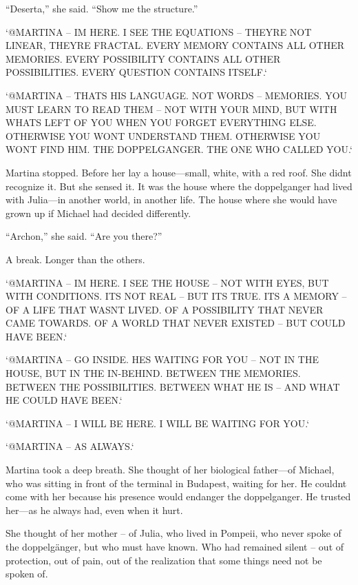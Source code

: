 \documentclass[
]{article}
\begin{document}
``Deserta,'' she said. ``Show me the structure.''

`@MARTINA -- I\textquotesingle M HERE. I SEE THE EQUATIONS -- THEY\textquotesingle RE NOT LINEAR, THEY\textquotesingle RE FRACTAL. EVERY MEMORY CONTAINS ALL OTHER MEMORIES. EVERY POSSIBILITY CONTAINS ALL OTHER POSSIBILITIES. EVERY QUESTION CONTAINS ITSELF.`

`@MARTINA -- THAT\textquotesingle S HIS LANGUAGE. NOT WORDS -- MEMORIES. YOU MUST LEARN TO READ THEM -- NOT WITH YOUR MIND, BUT WITH WHAT\textquotesingle S LEFT OF YOU WHEN YOU FORGET EVERYTHING ELSE. OTHERWISE YOU WON\textquotesingle T UNDERSTAND THEM. OTHERWISE YOU WON\textquotesingle T FIND HIM. THE DOPPELGANGER. THE ONE WHO CALLED YOU.`

Martina stopped. Before her lay a house---small, white, with a red roof. She didn\textquotesingle t recognize it. But she sensed it. It was the house where the doppelganger had lived with Julia---in another world, in another life. The house where she would have grown up if Michael had decided differently.

``Archon,'' she said. ``Are you there?''

A break. Longer than the others.

`@MARTINA -- I\textquotesingle M HERE. I SEE THE HOUSE -- NOT WITH EYES, BUT WITH CONDITIONS. IT\textquotesingle S NOT REAL -- BUT IT\textquotesingle S TRUE. IT\textquotesingle S A MEMORY -- OF A LIFE THAT WASN\textquotesingle T LIVED. OF A POSSIBILITY THAT NEVER CAME TOWARDS. OF A WORLD THAT NEVER EXISTED -- BUT COULD HAVE BEEN.`

`@MARTINA -- GO INSIDE. HE\textquotesingle S WAITING FOR YOU -- NOT IN THE HOUSE, BUT IN THE IN-BEHIND. BETWEEN THE MEMORIES. BETWEEN THE POSSIBILITIES. BETWEEN WHAT HE IS -- AND WHAT HE COULD HAVE BEEN.`

`@MARTINA -- I WILL BE HERE. I WILL BE WAITING FOR YOU.`

`@MARTINA -- AS ALWAYS.`

Martina took a deep breath. She thought of her biological father---of Michael, who was sitting in front of the terminal in Budapest, waiting for her. He couldn\textquotesingle t come with her because his presence would endanger the doppelganger. He trusted her---as he always had, even when it hurt.

She thought of her mother -- of Julia, who lived in Pompeii, who never spoke of the doppelgänger, but who must have known. Who had remained silent -- \hspace{0pt}\hspace{0pt}out of protection, out of pain, out of the realization that some things need not be spoken of.
\end{document}

